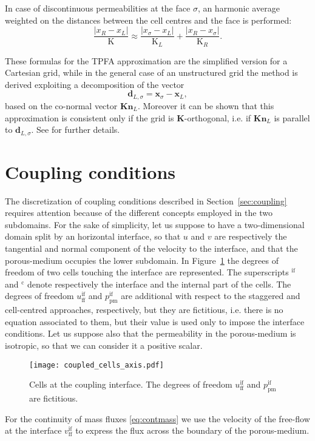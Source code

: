 In case of discontinuous permeabilities at the face $\sigma$, an harmonic 
average weighted on the distances between the cell centres and the face is 
performed:
\begin{equation}
\frac{|x_R - x_L|}{\mathrm{K}} \approx 
\frac{|x_\sigma - x_L|}{\mathrm{K}_L}+\frac{|x_R - x_\sigma|}{\mathrm{K}_R}.
\end{equation}

These formulas for the TPFA approximation are the simplified version for a 
Cartesian grid, while in the general case of an unstructured grid the method is 
derived exploiting a decomposition of the vector
\begin{equation}
\mathbf{d}_{L,\sigma}=\mathbf{x}_\sigma - \mathbf{x}_L,
\end{equation}
based on the co-normal vector $\mathbf{Kn}_L$. Moreover it 
can be shown that this approximation is consistent only if the grid is 
$\mathbf{K}$-orthogonal, i.e. if $\mathbf{Kn}_L$ is parallel to $\mathbf{d}_{L, \sigma}$. 
See \cite{tesi:wolff} for further details.
%
\section{Coupling conditions}
The discretization of coupling conditions described in 
Section~\ref{sec:coupling} requires attention because of the different concepts 
employed in the two subdomains. For the sake of simplicity, let us suppose to 
have a two-dimensional domain split by an horizontal interface, so that $u$ and 
$v$ are respectively the tangential and normal component of the velocity to the 
interface, and that the porous-medium occupies the lower subdomain. In 
Figure~\ref{fig:coupledcells} the degrees of freedom of two cells touching 
the interface are represented. The superscripts $^\text{if}$ and $^\text{c}$ 
denote respectively the interface and the internal part of the cells.
The degrees of freedom $u_\text{ff}^\text{if}$ and $p_\text{pm}^\text{if}$ are additional with respect to the staggered and cell-centred approaches, respectively, but they are fictitious,
i.e. there is no equation associated to them, but their value is used only to impose the interface conditions.
Let us suppose also that the permeability in the porous-medium is isotropic,
so that we can consider it a positive scalar.

\begin{figure}
	\centering
	\texttt{[image: coupled\_cells\_axis.pdf]}
	\caption[Cells at the coupling interface]{Cells at the coupling interface. 
	The degrees of freedom $u_\text{ff}^\text{if}$ and $p_\text{pm}^\text{if}$ 
	are fictitious.}
	\label{fig:coupledcells}
\end{figure}
For the continuity of mass fluxes \eqref{eq:contmass} we use the velocity of 
the free-flow at the interface $v_\text{ff}^\text{if}$ to express the flux 
across the boundary of the porous-medium.

